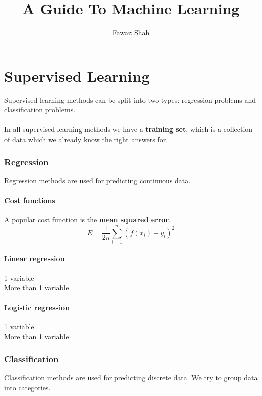 \documentclass{scrartcl}
\title{A Guide To Machine Learning}
\subtitle{}
\date{}
\author{Fawaz Shah}
\begin{document}
\large
\maketitle
\tableofcontents
\newpage

\part{Supervised Learning}

Supervised learning methods can be split into two types: regression problems and classification problems.
\\\\
In all supervised learning methods we have a \textbf{training set}, which is a collection of data which we already know the right answers for.

\section{Regression}

Regression methods are used for predicting continuous data.

\subsection{Cost functions}

A popular cost function is the \textbf{mean squared error}.
\begin{equation}
E = \frac{1}{2n} \sum^{n}_{i = 1} (f(x_{i}) - y_{i})^{2}
\end{equation}

\subsection{Linear regression}

1 variable\\
More than 1 variable

\subsection{Logistic regression}

1 variable\\
More than 1 variable

\section{Classification}

Classification methods are used for predicting discrete data. We try to 
group data into categories.
\end{document}
